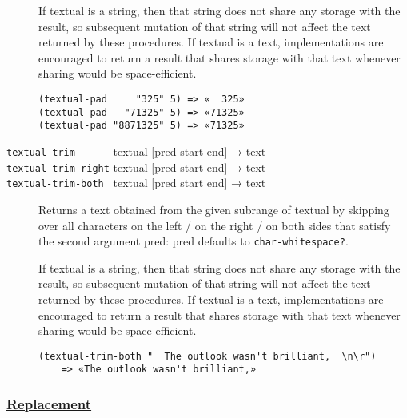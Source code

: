 \begin{description}
If textual is a string, then that string does not share any storage with
the result, so subsequent mutation of that string will not affect the
text returned by these procedures. If textual is a text, implementations
are encouraged to return a result that shares storage with that text
whenever sharing would be space-efficient.

\begin{verbatim}
(textual-pad     "325" 5) => «  325»
(textual-pad   "71325" 5) => «71325»
(textual-pad "8871325" 5) => «71325»
\end{verbatim}
\item[ \href{}{} \href{}{} \href{}{} \texttt{textual-trim~~~~~~} textual
{[}pred start end{]} → text\\
\texttt{textual-trim-right} textual {[}pred start end{]} → text\\
\texttt{textual-trim-both~} textual {[}pred start end{]} → text ]
Returns a text obtained from the given subrange of textual by skipping
over all characters on the left / on the right / on both sides that
satisfy the second argument pred: pred defaults to
\texttt{char-whitespace?}.

If textual is a string, then that string does not share any storage with
the result, so subsequent mutation of that string will not affect the
text returned by these procedures. If textual is a text, implementations
are encouraged to return a result that shares storage with that text
whenever sharing would be space-efficient.

\begin{verbatim}
(textual-trim-both "  The outlook wasn't brilliant,  \n\r")
    => «The outlook wasn't brilliant,»
\end{verbatim}
\end{description}

\subsubsection{\texorpdfstring{\href{}{Replacement}}{Replacement}}\label{replacement}

